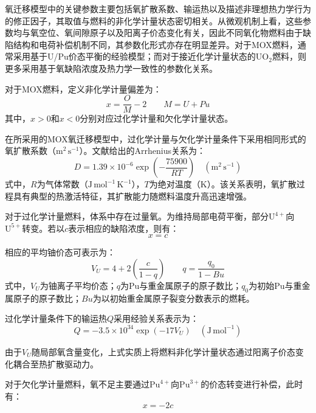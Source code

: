 氧迁移模型中的关键参数主要包括氧扩散系数、输运热以及描述非理想热力学行为的修正因子，其取值与燃料的非化学计量状态密切相关。从微观机制上看，这些参数均与氧空位、氧间隙原子以及阳离子价态变化有关，因此不同氧化物燃料由于缺陷结构和电荷补偿机制不同，其参数化形式亦存在明显差异。对于MOX燃料，通常采用基于U/Pu价态平衡的经验模型；而对于接近化学计量状态的UO$_2$燃料，则更多采用基于氧缺陷浓度及热力学一致性的参数化关系。

对于MOX燃料，定义非化学计量偏差为：
\begin{equation}
	x=\frac{O}{M}-2
	\qquad
	M=U+Pu 
\end{equation}
其中，$x>0$和$x<0$分别对应过化学计量和欠化学计量状态。

在所采用的MOX氧迁移模型中，过化学计量与欠化学计量条件下采用相同形式的氧扩散系数（$\mathrm{m^2\,s^{-1}}$）。文献给出的Arrhenius关系为：
\begin{equation}
	D
	=
	1.39\times10^{-6}
	\exp\left(
	-\frac{75900}{RT}
	\right)
	\quad
	\left(\mathrm{m^2\,s^{-1}}\right)
\end{equation}
\noindent 式中，$R$为气体常数（$\mathrm{J\,mol^{-1}\,K^{-1}}$），$T$为绝对温度（$\mathrm{K}$）。该关系表明，氧扩散过程具有典型的热激活特征，其扩散能力随燃料温度升高迅速增强。

对于过化学计量燃料，体系中存在过量氧。为维持局部电荷平衡，部分$\mathrm{U}^{4+}$向$\mathrm{U}^{5+}$转变。若以$c$表示相应的缺陷浓度，则有：
\begin{equation}
	x=c 
\end{equation}

相应的平均铀价态可表示为：
\begin{equation}
	V_U
	=
	4+
	2\left(
	\frac{c}{1-q}
	\right)
	\qquad
	q=\frac{q_0}{1-Bu}
\end{equation}
\noindent 式中，$V_U$为铀离子平均价态；$q$为Pu与重金属原子的原子数比；$q_0$为初始Pu与重金属原子的原子数比；$Bu$为以初始重金属原子裂变分数表示的燃耗。

过化学计量条件下的输运热$Q$采用经验关系表示为：
\begin{equation}
	Q
	=
	-3.5\times10^{34}
	\exp\left(-17V_U\right)
	\quad
	\left(\mathrm{J\,mol^{-1}}\right)
\end{equation}

由于$V_U$随局部氧含量变化，上式实质上将燃料非化学计量状态通过阳离子价态变化耦合至热扩散驱动力。

对于欠化学计量燃料，氧不足主要通过$\mathrm{Pu}^{4+}$向$\mathrm{Pu}^{3+}$的价态转变进行补偿，此时有：
\begin{equation}
	x=-2c 
\end{equation}

